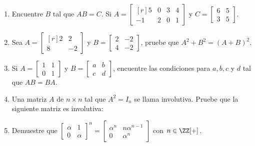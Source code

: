 \begin{enumerate}[start=35]
    \item Encuentre $B$ tal que $A B=C$. Si $A=\begin{bmatrix*}[r]5 & 0 & 3 & 4 \\ -1 & 2 & 0 & 1\end{bmatrix*}$ y $C=\begin{bmatrix*}6 & 5 \\ 3 & 5\end{bmatrix*}$.
    \item Sea $A=\begin{bmatrix*}[r]2 & 2 \\ 8 & -2\end{bmatrix*}$ y $B=\begin{bmatrix*}2 & -2 \\ 4 & -2\end{bmatrix*}$, pruebe que $A^{2}+B^{2}=(A+B)^{2}$.
    \item Si $A=\begin{bmatrix*}1 & 1 \\ 0 & 1\end{bmatrix*}$ y $B=\begin{bmatrix*}a & b \\ c & d\end{bmatrix*}$, encuentre las condiciones para $a, b, c$ y $d$ tal que $A B=B A$.
    \item Una matriz $A$ de $n \times n$ tal que $A^{2}=I_{n}$ se llama involutiva. Pruebe que la siguiente matriz es involutiva:
    \begin{matrizn}
    \end{matrizn}
    \item Demuestre que $\begin{bmatrix*}\alpha & 1 \\ 0 & \alpha\end{bmatrix*}^{n}=\begin{bmatrix*}\alpha^{n} & n \alpha^{n-1} \\ 0 & \alpha^{n}\end{bmatrix*}$ con $n \in \ZZ[+]$.

\end{enumerate}
